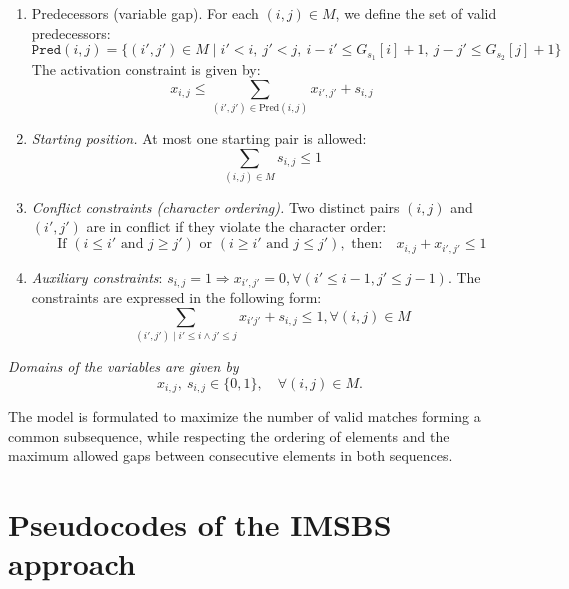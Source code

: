 \documentclass[runningheads]{llncs}
\begin{document}
 \begin{enumerate}
 	\item \textrm{Predecessors (variable gap).}  
 	For each $(i,j) \in M$, we define the set of valid predecessors:
 	\[
 	\texttt{Pred}(i,j) =
 	\{ (i',j') \in M \mid i' < i,\ j' < j,\ i - i' \leq G_{s_1}[i] + 1,\ j - j' \leq G_{s_2}[j] + 1 \}
 	\]
 	The activation constraint is given by:
 	\[
 	x_{i,j} \leq \sum_{(i',j') \in \textrm{Pred}(i,j)} x_{i',j'} + s_{i,j}
 	\]
 	
 	\item \textit{Starting position.}  
 	At most one starting pair is allowed:
 	\[
 	\sum_{(i,j) \in M} s_{i,j} \leq 1
 	\]
 	
 	\item \textit{Conflict constraints (character ordering).}  
 	Two distinct pairs $(i,j)$ and $(i',j')$ are in conflict if they violate the character order:
 	\[
 	\textrm{If } (i \leq i' \textrm{ and } j \geq j') \textrm{ or }
 	(i \geq i' \textrm{ and } j \leq j'), \textrm{ then:}
 	\quad x_{i,j} + x_{i',j'} \leq 1
 	\]
 	\item \textit{Auxiliary constraints}: $s_{i, j}=1 \Rightarrow x_{i',j'}=0, \forall (i' \leq i-1, j' \leq j-1)$. The constraints are expressed in the following form: 
 	$$ \sum_{(i', j') \mid i'\leq i \wedge j'\leq j} x_{i' j'} + s_{i, j} \leq 1, \forall (i, j) \in M$$
 \end{enumerate}
 
 
 \textit{Domains of the variables are given by}
 \[
 x_{i,j},\ s_{i,j} \in \{0,1\}, \quad \forall (i,j) \in M.
 \]
 
 The model is formulated to maximize the number of valid matches forming a common subsequence,
 while respecting the ordering of elements and the maximum allowed gaps between consecutive
 elements in both sequences.
 
 \section{Pseudocodes of the IMSBS approach}
 
\end{document}
